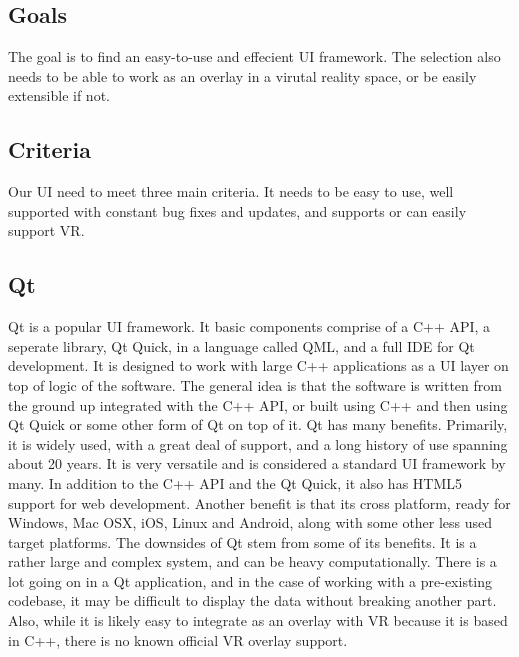 \documentclass{article}
\begin{document}
\subsection{Goals}
The goal is to find an easy-to-use and effecient UI framework. The selection
also needs to be able to work as an overlay in a virutal reality space, or be
easily extensible if not. 

\subsection{Criteria}
Our UI need to meet three main criteria. It needs to be easy to use,
well supported with constant bug fixes and updates, and supports or
can easily support VR.

\subsection{Qt}
Qt is a popular UI framework. It basic components comprise of a C++ API, a seperate library, Qt Quick,
in a language called QML, and a full IDE for Qt development. It is designed to work with large C++ applications
as a UI layer on top of logic of the software. The general idea is that the software is written from the ground
up integrated with the C++ API, or built using C++ and then using Qt Quick or some other form of Qt on top of 
it. Qt has many benefits. Primarily, it is widely used, with a great deal of support, and a long history of
use spanning about 20 years. It is very versatile and is considered a standard UI framework by many. In
addition to the C++ API and the Qt Quick, it also has HTML5 support for web development. Another benefit
is that its cross platform, ready for Windows, Mac OSX, iOS, Linux and Android, along with some other 
less used target platforms. The downsides of Qt stem from some of its benefits. It is a rather large
and complex system, and can be heavy computationally. There is a lot going on in a Qt application,
and in the case of working with a pre-existing codebase, it may be difficult to display the data
without breaking another part. Also, while it is likely easy to integrate as an overlay with VR
because it is based in C++, there is no known official VR overlay support. \cite{qtsoft}
\end{document}
